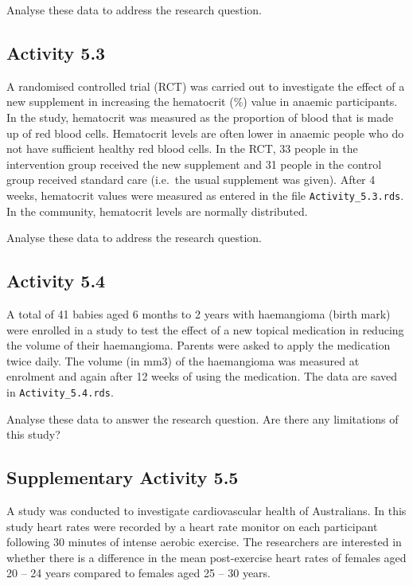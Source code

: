 \documentclass[
  a4paper,
]{memoir}
\begin{document}
Analyse these data to address the research question.

\subsection*{Activity 5.3}\label{activity-5.3}

A randomised controlled trial (RCT) was carried out to investigate the
effect of a new supplement in increasing the hematocrit (\%) value in
anaemic participants. In the study, hematocrit was measured as the
proportion of blood that is made up of red blood cells. Hematocrit
levels are often lower in anaemic people who do not have sufficient
healthy red blood cells. In the RCT, 33 people in the intervention group
received the new supplement and 31 people in the control group received
standard care (i.e.~the usual supplement was given). After 4 weeks,
hematocrit values were measured as entered in the file
\texttt{Activity\_5.3.rds}. In the community, hematocrit levels are
normally distributed.

Analyse these data to address the research question.

\subsection*{Activity 5.4}\label{activity-5.4}

A total of 41 babies aged 6 months to 2 years with haemangioma (birth
mark) were enrolled in a study to test the effect of a new topical
medication in reducing the volume of their haemangioma. Parents were
asked to apply the medication twice daily. The volume (in mm3) of the
haemangioma was measured at enrolment and again after 12 weeks of using
the medication. The data are saved in \texttt{Activity\_5.4.rds}.

Analyse these data to answer the research question. Are there any
limitations of this study?

\subsection*{Supplementary Activity
5.5}\label{supplementary-activity-5.5}

A study was conducted to investigate cardiovascular health of
Australians. In this study heart rates were recorded by a heart rate
monitor on each participant following 30 minutes of intense aerobic
exercise. The researchers are interested in whether there is a
difference in the mean post-exercise heart rates of females aged 20 --
24 years compared to females aged 25 -- 30 years.
\end{document}
